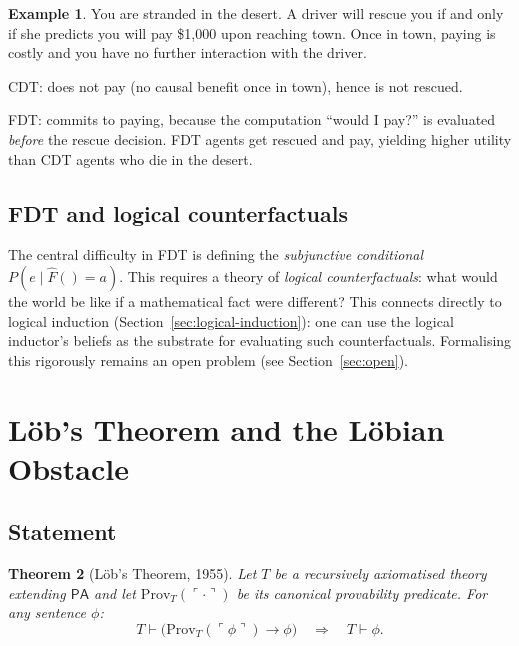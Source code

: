 \documentclass[11pt,a4paper]{article}
\newtheorem{theorem}{Theorem}[section]
\theoremstyle{definition}
\newtheorem{example}[theorem]{Example}
\theoremstyle{remark}
\newcommand{\PA}{\mathsf{PA}}
\newcommand{\Prov}{\mathrm{Prov}}
\begin{document}
\begin{example}
You are stranded in the desert.  A driver will rescue you if and only if
she predicts you will pay \$1{,}000 upon reaching town.  Once in town,
paying is costly and you have no further interaction with the driver.

CDT: does not pay (no causal benefit once in town), hence is not rescued.

FDT: commits to paying, because the computation ``would I pay?'' is
evaluated \emph{before} the rescue decision.  FDT agents get rescued and
pay, yielding higher utility than CDT agents who die in the desert.
\end{example}

\subsection{FDT and logical counterfactuals}

The central difficulty in FDT is defining the \emph{subjunctive
conditional} $P(e \mid \widehat{F}() = a)$.  This requires a theory of
\emph{logical counterfactuals}: what would the world be like if a
mathematical fact were different?  This connects directly to logical
induction (Section~\ref{sec:logical-induction}): one can use the logical
inductor's beliefs as the substrate for evaluating such counterfactuals.
Formalising this rigorously remains an open problem
(see Section~\ref{sec:open}).

\section{L\"ob's Theorem and the L\"obian Obstacle}\label{sec:lob}

\subsection{Statement}

\begin{theorem}[L\"ob's Theorem, 1955]\label{thm:lob}
Let $T$ be a recursively axiomatised theory extending $\PA$ and let
$\Prov_T(\ulcorner \cdot \urcorner)$ be its canonical provability
predicate.  For any sentence $\phi$:
\[
  T \vdash \bigl(\Prov_T(\ulcorner \phi \urcorner) \to \phi\bigr)
  \quad \Longrightarrow \quad
  T \vdash \phi.
\]
\end{theorem}
\end{document}

